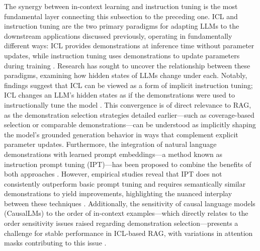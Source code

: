 \documentclass[11pt]{article}
\begin{document}
The synergy between in-context learning and instruction tuning is the most fundamental layer connecting this subsection to the preceding one. ICL and instruction tuning are the two primary paradigms for adapting LLMs to the downstream applications discussed previously, operating in fundamentally different ways: ICL provides demonstrations at inference time without parameter updates, while instruction tuning uses demonstrations to update parameters during training \cite{ref138}. Research has sought to uncover the relationship between these paradigms, examining how hidden states of LLMs change under each. Notably, findings suggest that ICL can be viewed as a form of implicit instruction tuning; ICL changes an LLM's hidden states as if the demonstrations were used to instructionally tune the model \cite{ref138}. This convergence is of direct relevance to RAG, as the demonstration selection strategies detailed earlier---such as coverage-based selection or comparable demonstrations---can be understood as implicitly shaping the model's grounded generation behavior in ways that complement explicit parameter updates. Furthermore, the integration of natural language demonstrations with learned prompt embeddings---a method known as instruction prompt tuning (IPT)---has been proposed to combine the benefits of both approaches \cite{ref139}. However, empirical studies reveal that IPT does not consistently outperform basic prompt tuning and requires semantically similar demonstrations to yield improvements, highlighting the nuanced interplay between these techniques \cite{ref139}. Additionally, the sensitivity of causal language models (CausalLMs) to the order of in-context examples---which directly relates to the order sensitivity issues raised regarding demonstration selection---presents a challenge for stable performance in ICL-based RAG, with variations in attention masks contributing to this issue \cite{ref140}.
\end{document}
